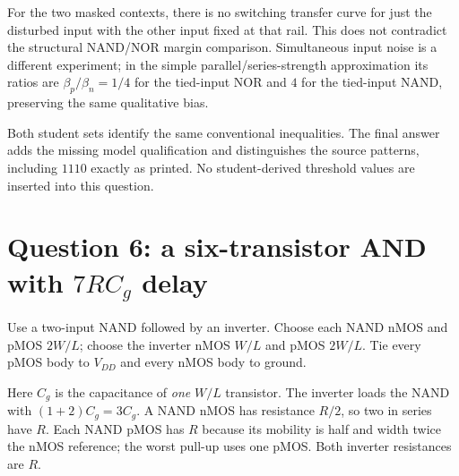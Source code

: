 \documentclass[10pt]{article}
\newcommand{\mos}[4]{\begin{scope}[shift={(#1,#2)}]
\draw(0,.24)--(0,-.24);\draw(0,.2)--(.25,.2)--(.25,.5);\draw(0,-.2)--(.25,-.2)--(.25,-.5);
\draw(-.16,.23)--(-.16,-.23);
\ifnum#4=1\draw(-.26,0)circle(.06);\draw(-.75,0)--(-.32,0);\else\draw(-.75,0)--(-.16,0);\fi
\node[anchor=east,font=\scriptsize]at(-.76,0){$#3$};\end{scope}}
\newcommand{\gnd}[2]{\draw(#1,#2)--(#1,{#2-.12});\draw({#1-.17},{#2-.12})--({#1+.17},{#2-.12});\draw({#1-.11},{#2-.2})--({#1+.11},{#2-.2});}
\newcommand{\rail}[3]{\draw(#1,#2)--(#1,{#2+.14});\node[above,font=\scriptsize]at(#1,{#2+.14}){$#3$};}
\begin{document}
For the two masked contexts, there is no switching transfer curve for just the disturbed input with the other input fixed at that rail. This does not contradict the structural NAND/NOR margin comparison. Simultaneous input noise is a different experiment; in the simple parallel/series-strength approximation its ratios are $\beta_p/\beta_n=1/4$ for the tied-input NOR and $4$ for the tied-input NAND, preserving the same qualitative bias.

Both student sets identify the same conventional inequalities. The final answer adds the missing model qualification and distinguishes the source patterns, including $1110$ exactly as printed. No student-derived threshold values are inserted into this question.

\newpage\section*{Question 6: a six-transistor AND with $7RC_g$ delay}
Use a two-input NAND followed by an inverter. Choose each NAND nMOS and pMOS $2W/L$; choose the inverter nMOS $W/L$ and pMOS $2W/L$. Tie every pMOS body to $V_{DD}$ and every nMOS body to ground.
\begin{center}\end{center}
Here $C_g$ is the capacitance of \emph{one} $W/L$ transistor. The inverter loads the NAND with $(1+2)C_g=3C_g$. A NAND nMOS has resistance $R/2$, so two in series have $R$. Each NAND pMOS has $R$ because its mobility is half and width twice the nMOS reference; the worst pull-up uses one pMOS. Both inverter resistances are $R$.
\end{document}
